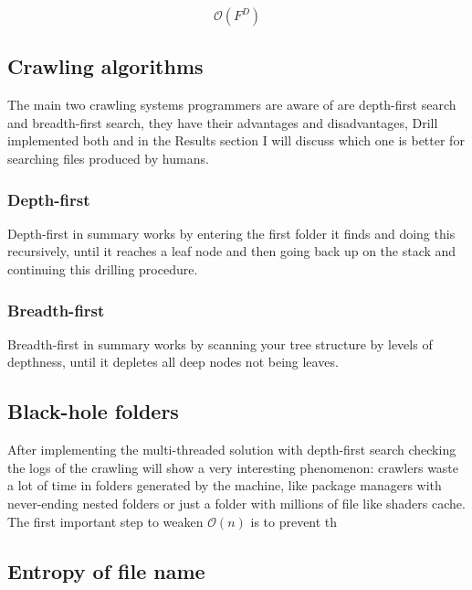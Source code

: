 \documentclass{article}
\newcommand{\bigO}{\mathcal{O}}
\begin{document}
\begin{equation}
    \label{equation_depth_analysis}
    \bigO(F^D)
\end{equation}



\subsection{Crawling algorithms}

The main two crawling systems programmers are aware of are depth-first search and breadth-first search, they have their advantages and disadvantages, Drill implemented both and in the Results section I will discuss which one is better for searching files produced by humans.


\subsubsection{Depth-first}

Depth-first in summary works by entering the first folder it finds and doing this recursively, until it reaches a leaf node and then going back up on the stack and continuing this drilling procedure.


\subsubsection{Breadth-first}

Breadth-first in summary works by scanning your tree structure by levels of depthness, until it depletes all deep nodes not being leaves.


\subsection{Black-hole folders}

After implementing the multi-threaded solution with depth-first search checking the logs of the crawling will show a very interesting phenomenon: crawlers waste a lot of time in folders generated by the machine, like package managers with never-ending nested folders or just a folder with millions of file like shaders cache.
The first important step to weaken $\bigO(n)$ is to prevent th






\subsection{Entropy of file name}
\end{document}
